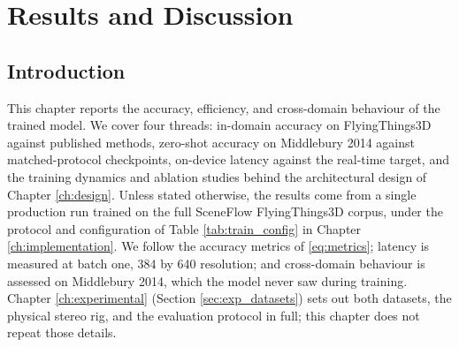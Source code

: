 \chapter{Results and Discussion}
\label{ch:results}

\section{Introduction}
This chapter reports the accuracy, efficiency, and cross-domain
behaviour of the trained model. We cover four threads: in-domain
accuracy on FlyingThings3D against published methods, zero-shot
accuracy on Middlebury 2014 against matched-protocol checkpoints,
on-device latency against the real-time target, and the training
dynamics and ablation studies behind the architectural design of
Chapter \ref{ch:design}. Unless stated otherwise, the results come
from a single production run trained on the full SceneFlow
FlyingThings3D corpus, under the protocol and configuration of Table
\ref{tab:train_config} in Chapter \ref{ch:implementation}. We follow
the accuracy metrics of \eqref{eq:metrics}; latency is measured at
batch one, 384 by 640 resolution; and cross-domain behaviour is
assessed on Middlebury 2014, which the model never saw during
training. Chapter \ref{ch:experimental} (Section
\ref{sec:exp_datasets}) sets out both datasets, the physical stereo
rig, and the evaluation protocol in full; this chapter does not repeat
those details.

